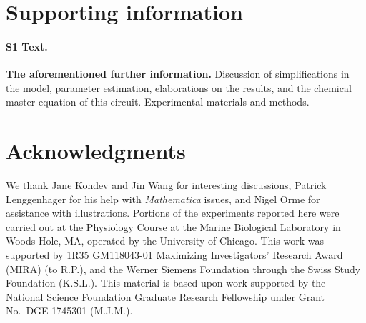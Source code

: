 \documentclass[10pt,letterpaper]{article}
\begin{document}
	\section*{Supporting information}
	\paragraph*{S1 Text.}
	\label{S1_Text}
	{\bf The aforementioned further information.} Discussion of simplifications
	in the model, parameter estimation, elaborations on the results, and the
	chemical master equation of this circuit. Experimental materials and methods.
	
	\section*{Acknowledgments}
	We thank Jane Kondev and Jin Wang for interesting discussions, Patrick Lenggenhager for his help with \emph{Mathematica} issues, and Nigel Orme for assistance with illustrations.
	Portions of the experiments reported here were carried out at the
	Physiology Course at the Marine Biological Laboratory in Woods
	Hole, MA, operated by the University of Chicago.
	This work was supported by 1R35 GM118043-01 Maximizing Investigators'
	Research Award (MIRA) (to R.P.), and the Werner Siemens Foundation
	through the Swiss Study Foundation (K.S.L.). This material is based upon
	work supported by the National Science Foundation Graduate Research
	Fellowship under Grant No.\ DGE-1745301 (M.J.M.).
	
	\nolinenumbers
	
	
\end{document}
